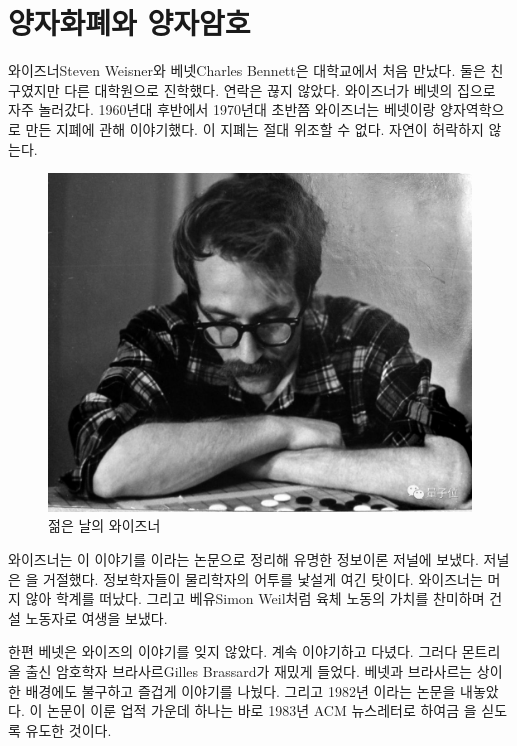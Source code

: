 \documentclass[a4paper,chapter,atbegshi]{oblivoir}
\begin{document}
\chapter{양자화폐와 양자암호}
와이즈너{\tiny Steven Weisner}와 베넷{\tiny Charles Bennett}은 대학교에서
처음 만났다. 둘은 친구였지만 다른 대학원으로 진학했다. 연락은 끊지
않았다. 와이즈너가 베넷의 집으로 자주 놀러갔다. 1960년대 후반에서
1970년대 초반쯤 와이즈너는 베넷이랑 양자역학으로 만든 지폐에 관해
이야기했다. 이 지폐는 절대 위조할 수 없다. 자연이 허락하지 않는다. 
\begin{figure}[h]\centering
  \includegraphics[scale=0.2]{weizner}
  \caption{젊은 날의 와이즈너}
\end{figure}

\noindent
와이즈너는 이 이야기를 이라는 논문으로
정리해 유명한 정보이론 저널에 보냈다. 저널은 을 거절했다.
정보학자들이 물리학자의 어투를 낯설게 여긴 탓이다. 와이즈너는 머지 않아 학계를
떠났다. 그리고 베유{\tiny Simon Weil}처럼 육체 노동의 가치를 찬미하며 건설
노동자로 여생을 보냈다.

한편 베넷은 와이즈의 이야기를 잊지 않았다. 계속 이야기하고 다녔다. 그러다 
몬트리올 출신 암호학자 브라사르{\tiny Gilles Brassard}가 재밌게 들었다. 
베넷과 브라사르는 상이한 배경에도 불구하고 즐겁게 이야기를 나눴다. 
그리고 1982년 이라는 논문을 내놓았다. 
이 논문이 이룬 업적 가운데 하나는 바로 1983년 ACM 뉴스레터로 하여금 을 싣도록 유도한 것이다. 
\end{document}
